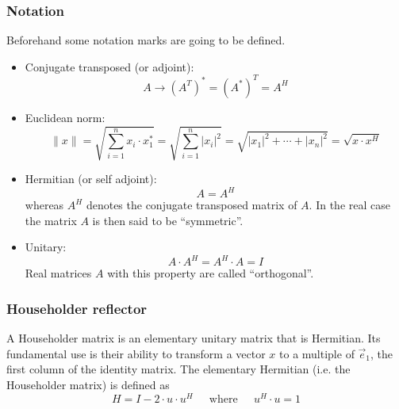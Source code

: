 \subsubsection{Notation}

Beforehand some notation marks are going to be defined.

\begin{itemize}

\item Conjugate transposed (or adjoint):
\begin{equation*}
A \rightarrow \left(A^T\right)^* = \left(A^*\right)^T = A^H
\end{equation*}


\item Euclidean norm:
\begin{equation*}
\lVert x \rVert = \sqrt{\sum^n_{i=1} x_i\cdot x^*_1} =
\sqrt{\sum^n_{i=1} \lvert x_i\rvert^2} = 
\sqrt{\lvert x_1\rvert^2 + \cdots  + \lvert x_n\rvert^2} = 
\sqrt{x\cdot x^H}
\end{equation*}

\item Hermitian (or self adjoint):
\begin{equation*}
A = A^H
\end{equation*}
whereas $A^H$ denotes the conjugate transposed matrix of $A$.  In the
real case the matrix $A$ is then said to be ``symmetric''.

\item Unitary:
\begin{equation*}
A\cdot A^H = A^H\cdot A = I
\end{equation*}
Real matrices $A$ with this property are called ``orthogonal''.

\end{itemize}

\subsubsection{Householder reflector}

A Householder matrix is an elementary unitary matrix that is
Hermitian.  Its fundamental use is their ability to transform a vector
$x$ to a multiple of $\vec{e}_1$, the first column of the identity
matrix.  The elementary Hermitian (i.e. the Householder matrix) is
defined as
\begin{equation}
H = I - 2\cdot u\cdot u^H
\;\;\;\;
\textrm{ where }
\;\;\;\;
u^H\cdot u = 1
\end{equation}

